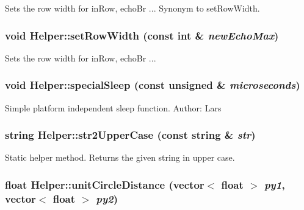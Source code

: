 \label{classHelper_af4fcef11ef8f781c90cee2ba176ec521}
Sets the row width for inRow, echoBr ... Synonym to setRowWidth. \hypertarget{classHelper_a53b99bb6c9777901242656867ed67fff}{
\subsubsection[{setRowWidth}]{\setlength{\rightskip}{0pt plus 5cm}void Helper::setRowWidth (const int \& {\em newEchoMax})}}
\label{classHelper_a53b99bb6c9777901242656867ed67fff}
Sets the row width for inRow, echoBr ... \hypertarget{classHelper_a213de41335d301f71a2e717777caa89b}{
\subsubsection[{specialSleep}]{\setlength{\rightskip}{0pt plus 5cm}void Helper::specialSleep (const unsigned \& {\em microseconds})}}
\label{classHelper_a213de41335d301f71a2e717777caa89b}
Simple platform independent sleep function. Author: Lars \hypertarget{classHelper_ae07f060871ece1f065a82afa201e779b}{
\subsubsection[{str2UpperCase}]{\setlength{\rightskip}{0pt plus 5cm}string Helper::str2UpperCase (const string \& {\em str})}}
\label{classHelper_ae07f060871ece1f065a82afa201e779b}
Static helper method. Returns the given string in upper case. \hypertarget{classHelper_ae8648fd390b8435d8cd26cfcee334432}{
\subsubsection[{unitCircleDistance}]{\setlength{\rightskip}{0pt plus 5cm}float Helper::unitCircleDistance (vector$<$ float $>$ {\em py1}, \/  vector$<$ float $>$ {\em py2})}}
\label{classHelper_ae8648fd390b8435d8cd26cfcee334432}
